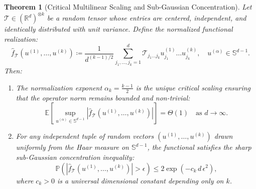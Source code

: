 \documentclass[11pt,a4paper,reqno]{amsart}
\newtheorem{theorem}{Theorem}[section]
\theoremstyle{definition}
\numberwithin{equation}{section}
\newcommand{\R}{\mathbb{R}}
\newcommand{\Sph}{\mathbb{S}}
\begin{document}
\begin{theorem}[Critical Multilinear Scaling and Sub-Gaussian Concentration]
\label{thm:critical_scaling}
Let $\mathcal{T} \in (\R^d)^{\otimes k}$ be a random tensor whose entries are centered, independent, and identically distributed with unit variance. Define the normalized functional realization:
\begin{equation}
    \label{eq:renorm_tensor_form}
    \widehat{f}_{\mathcal{T}}(u^{(1)}, \dots, u^{(k)}) \coloneqq \frac{1}{d^{(k-1)/2}} \sum_{j_1, \dots, j_k = 1}^d \mathcal{T}_{j_1 \dots j_k} u_{j_1}^{(1)} \dots u_{j_k}^{(k)}, \quad u^{(\alpha)} \in \Sph^{d-1}.
\end{equation}
Then:
\begin{enumerate}[label=(\roman*)]
    \item The normalization exponent $\alpha_k = \frac{k-1}{2}$ is the unique critical scaling ensuring that the operator norm remains bounded and non-trivial:
    \begin{equation}
        \mathbb{E}\left[ \sup_{u^{(\alpha)} \in \Sph^{d-1}} |\widehat{f}_{\mathcal{T}}(u^{(1)}, \dots, u^{(k)})| \right] = \Theta(1) \quad \text{as } d \to \infty.
    \end{equation}
    \item For any independent tuple of random vectors $(u^{(1)}, \dots, u^{(k)})$ drawn uniformly from the Haar measure on $\Sph^{d-1}$, the functional satisfies the sharp sub-Gaussian concentration inequality:
    \begin{equation}
        \label{eq:concentration_inequality}
        \mathbb{P}\left( |\widehat{f}_{\mathcal{T}}(u^{(1)}, \dots, u^{(k)})| > \epsilon \right) \le 2 \exp\left( - c_k \, d \, \epsilon^2 \right),
    \end{equation}
    where $c_k > 0$ is a universal dimensional constant depending only on $k$.
\end{enumerate}
\end{theorem}
\end{document}
